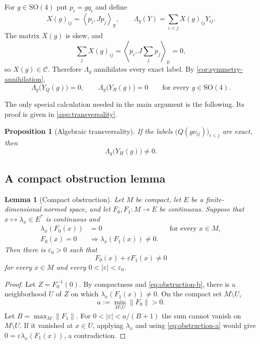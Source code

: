 \documentclass[11pt,reqno]{amsart}
\newtheorem{proposition}[theorem]{Proposition}
\newtheorem{lemma}[theorem]{Lemma}
\theoremstyle{definition}
\theoremstyle{remark}
\newcommand{\R}{\mathbb R}
\newcommand{\SO}{\mathrm{SO}}
\newcommand{\eps}{\varepsilon}
\newcommand{\cC}{\mathcal C}
\newcommand{\ip}[2]{\left\langle #1,#2\right\rangle}
\newcommand{\norm}[1]{\left\lVert #1\right\rVert}
\newcommand{\abs}[1]{\left\lvert #1\right\rvert}
\begin{document}
For $g\in\SO(4)$ put $p_i=gq_i$ and define
\begin{equation}\label{eq:X-Lambda}
X(g)_{ij}=\ip{p_i}{Jp_j}_{\R},
\qquad
\Lambda_g(Y)=\sum_{i<j}X(g)_{ij}Y_{ij}.
\end{equation}
The matrix $X(g)$ is skew, and
\[
\sum_jX(g)_{ij}=\ip{p_i}{J\sum_jp_j}_{\R}=0,
\]
so $X(g)\in\cC$.  Therefore $\Lambda_g$ annihilates every exact label.
By \cref{cor:symmetry-annihilation},
\begin{equation}\label{eq:QR-annihilation}
\Lambda_g\bigl(Y_Q(g)\bigr)=0,
\qquad
\Lambda_g\bigl(Y_R(g)\bigr)=0
\qquad\text{for every }g\in\SO(4).
\end{equation}

The only special calculation needed in the main argument is the following.
Its proof is given in \cref{app:transversality}.

\begin{proposition}[Algebraic transversality]\label{prop:algebraic-transversality}
If the labels $\bigl(Q(g\nu_{ij})\bigr)_{i<j}$ are exact, then
\begin{equation}\label{eq:transversality}
\Lambda_g\bigl(Y_H(g)\bigr)\ne0.
\end{equation}
\end{proposition}

\subsection{A compact obstruction lemma}

\begin{lemma}[Compact obstruction]\label{lem:compact-obstruction}
Let $M$ be compact, let $E$ be a finite-dimensional normed space, and let
$F_0,F_1\colon M\to E$ be continuous.  Suppose that $x\mapsto\lambda_x\in E^*$
is continuous and
\begin{align}
\lambda_x(F_0(x))&=0 &&\text{for every }x\in M,\label{eq:obstruction-a}\\
F_0(x)=0&\Longrightarrow \lambda_x(F_1(x))\ne0.\label{eq:obstruction-b}
\end{align}
Then there is $\eps_0>0$ such that
\[
F_0(x)+\eps F_1(x)\ne0
\]
for every $x\in M$ and every $0<\abs\eps<\eps_0$.
\end{lemma}

\begin{proof}
Let $Z=F_0^{-1}(0)$.  By compactness and
\eqref{eq:obstruction-b}, there is a neighborhood $U$ of $Z$ on which
$\lambda_x(F_1(x))\ne0$.  On the compact set $M\setminus U$,
\[
a:=\min_{M\setminus U}\norm{F_0}>0.
\]
Let $B=\max_M\norm{F_1}$.  For $0<\abs\eps<a/(B+1)$ the sum cannot vanish on
$M\setminus U$.  If it vanished at $x\in U$, applying $\lambda_x$ and using
\eqref{eq:obstruction-a} would give
$0=\eps\lambda_x(F_1(x))$, a contradiction.
\end{proof}
\end{document}
